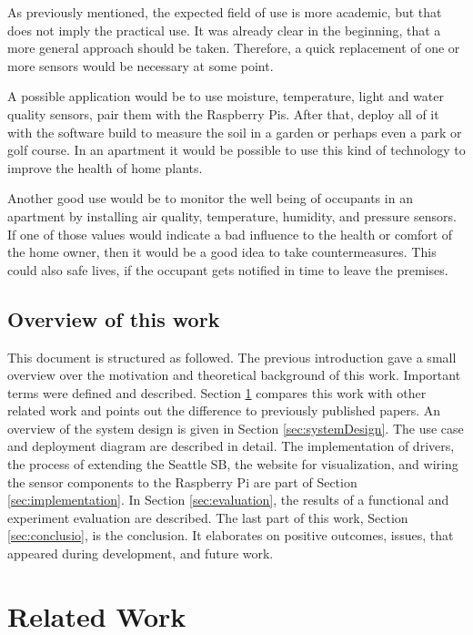\documentclass{article}      %
\begin{document}
As previously mentioned, the expected field of use is more academic, but that does not imply the practical use. It was already clear in the beginning, that a more general approach should be taken. Therefore, a quick replacement of one or more sensors would be necessary at some point. 

A possible application would be to use moisture, temperature, light and water quality sensors, pair them with the Raspberry Pis. After that, deploy all of it with the software build to measure the soil in a garden or perhaps even a park or golf course. In an apartment it would be possible to use this kind of technology to improve the health of home plants.

Another good use would be to monitor the well being of occupants in an apartment by installing air quality, temperature, humidity, and pressure sensors. If one of those values would indicate a bad influence to the health or comfort of the home owner, then it would be a good idea to take countermeasures. This could also safe lives, if the occupant gets notified in time to leave the premises.

\subsection{Overview of this work}

This document is structured as followed. The previous introduction gave a small overview over the motivation and theoretical background of this work. Important terms were defined and described. Section \ref{sec:relatedWork} compares this work with other related work and points out the difference to previously published papers. An overview of the system design is given in Section \ref{sec:systemDesign}. The use case and deployment diagram are described in detail. The implementation of drivers, the process of extending the Seattle \gls{SB}, the website for visualization, and wiring the sensor components to the Raspberry Pi are part of Section \ref{sec:implementation}. In Section \ref{sec:evaluation}, the results of a functional and experiment evaluation are described. The last part of this work, Section \ref{sec:conclusio}, is the conclusion. It elaborates on positive outcomes, issues, that appeared during development, and future work.

\section{Related Work} \label{sec:relatedWork}
\end{document}
